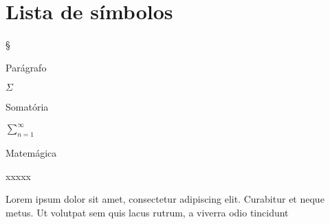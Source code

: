 \newcommand\simboloTamanho{5ex} %
\newcommand\simboloGap{1ex} %
\newcommand\simboloNomeTamanho{\dimexpr\linewidth-\simboloTamanho-\simboloGap\relax}
\newcommand\simbolo[2]{\noindent\parbox[t]{\simboloTamanho}{#1\strut}%
  \hspace{\simboloGap}%
  \parbox[t]{\simboloNomeTamanho}{#2\strut}}

\chapter*{Lista de símbolos}

\simbolo{\S}{Parágrafo}

\simbolo{$\Sigma$}{Somatória}

\simbolo{$\sum_{n = 1}^{\infty}$}{Matemágica}

\simbolo{xxxxx}{Lorem ipsum dolor sit amet, consectetur adipiscing elit. Curabitur et neque metus. Ut volutpat sem quis lacus rutrum, a viverra odio tincidunt}